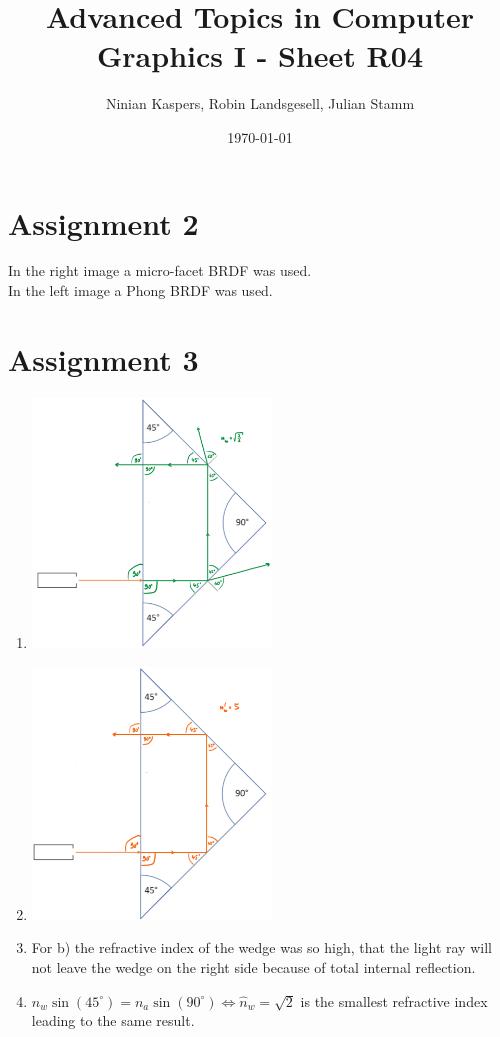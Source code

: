 \documentclass{article}
\title{Advanced Topics in Computer Graphics I - Sheet R04}
\author{Ninian Kaspers, Robin Landsgesell, Julian Stamm}
\date{\today}
\begin{document}
    \maketitle

    \section*{Assignment 2}
    
    In the right image a micro-facet BRDF was used.\\
    In the left image a Phong BRDF was used.\\

    \section*{Assignment 3}

    \begin{enumerate}[label=\alph*)]
        \item \includegraphics[width=0.5\textwidth]{3a.png}
        \item \includegraphics[width=0.5\textwidth]{3b.png}
        \item For b) the refractive index of the wedge was so high, that the light ray will not leave the wedge on the right side because of total internal reflection.
        \item $\hat{n}_w \sin(45^\circ) = n_a \sin(90^\circ) \Leftrightarrow \hat{n}_w = \sqrt{2}$ is the smallest refractive index leading to the same result.
    \end{enumerate}
    
\end{document}

